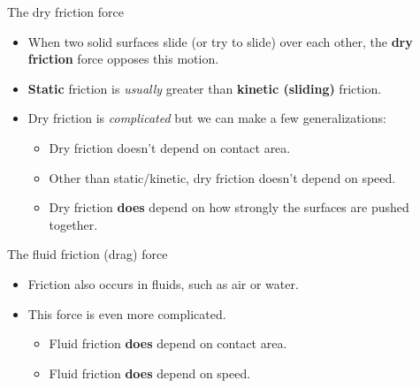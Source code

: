 \documentclass[english]{beamer}
\begin{document}
\begin{frame}{The dry friction force}
  \begin{itemize}
    \item When two solid surfaces slide (or try to slide) over each other, the \textbf{dry friction} force opposes this motion.
    \item \textbf{Static} friction is \emph{usually} greater than \textbf{kinetic (sliding)} friction.
    \item Dry friction is \emph{complicated} but we can make a few generalizations:
    \begin{itemize}
        \item Dry friction doesn't depend on contact area.
        \item Other than static/kinetic, dry friction doesn't depend on speed.
        \item Dry friction \textbf{does} depend on how strongly the surfaces are pushed together.
    \end{itemize}
  \end{itemize}
\end{frame}

\begin{frame}{The fluid friction (drag) force}
  \begin{itemize}
    \item Friction also occurs in fluids, such as air or water.
    \item This force is even more complicated.
    \begin{itemize}
        \item Fluid friction \textbf{does} depend on contact area.
        \item Fluid friction \textbf{does} depend on speed.
    \end{itemize}
  \end{itemize}
\end{frame}
\end{document}
